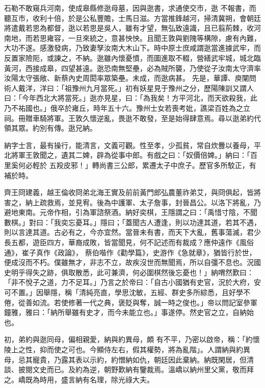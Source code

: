 \begin{pinyinscope}
 石勒不敢窺兵河南，使成皋縣修逖母墓，因與逖書，求通使交市，逖
 不報書，而聽互市，收利十倍，於是公私豐贍，士馬日滋。方當推鋒越河，掃清冀朔，會朝廷將遣戴若思為都督，逖以若思是吳人，雖有才望，無弘致遠識，且已翦荊棘，收河南地，而若思雍容，一旦來統之，意甚怏怏。且聞王敦與劉隗等構隙，慮有內難，大功不遂。感激發病，乃致妻孥汝南大木山下。時中原士庶咸謂逖當進據武牢，而反置家險阨，或諫之，不納。逖雖內懷憂憤，而圖進取不輟，營繕武牢城，城北臨黃河，西接成皋，四望甚遠。逖恐南無堅壘，必為賊所襲，乃使從子汝南太守濟率汝陽太守張敞、新蔡內史周閎率眾築壘。未成，而逖病甚。
 先是，華譚、庾闡問術人戴洋，洋曰：「祖豫州九月當死。」初有妖星見于豫州之分，歷陽陳訓又謂人曰：「今年西北大將當死。」逖亦見星，曰：「為我矣！方平河北，而天欲殺我，此乃不祐國也。」俄卒於雍丘，時年五十六。豫州士女若喪考妣，譙梁百姓為之立祠。冊贈車騎將軍。王敦久懷逆亂，畏逖不敢發，至是始得肆意焉。尋以逖弟約代領其眾。約別有傳。逖兄納。



 納字士言，最有操行，能清言，文義可觀。性至孝，少孤貧，常自炊釁以養母，平北將軍王敦聞之，遺其二婢，辟為從事中郎。有戲之曰：「奴價倍婢。」納曰：「百里奚何必輕於
 五羖皮邪！」轉尚書三公郎，累遷太子中庶子。歷官多所駮正，有補於時。



 齊王冏建義，越王倫收冏弟北海王實及前前黃門郎弘農董祚弟艾，與冏俱起，皆將害之，納上疏救焉，並見宥。後為中護軍、太子詹事，封晉昌公。以洛下將亂，乃避地東南。元帝作相，引為軍諮祭酒。納好奕棋，王隱謂之曰：「禹惜寸陰，不聞數棋。」對曰：「我奕忘憂耳。」隱曰；「蓋聞古人遭逢，則以功達其道，若其不遇，則以言達其道。古必有之，今亦宜然。當晉未有書，而天下大亂，舊事蕩滅，君少長五都，遊臣四方，華裔成敗，皆當聞見，何不記述而有裁成？應仲遠作《風俗通》，崔子真作《政論》，
 蔡伯喈作《勸學篇》，史游作《急就章》，猶皆行於世，便成沒而不朽。僕雖無才，非志不立，故疾沒世而無聞焉，所以自彊不息也。況國史明乎得失之跡，俱取散悉，此可兼濟，何必圍棋然後忘憂也！」納喟然歎曰：「非不悅子之道，力不足耳。」乃言之於帝曰：「自古小國猶有史官，況於大府，安可不置。」因舉隱，稱「清純亮直，學思沈敏，五經、群史多所綜悉，且好學不倦，從善如流。若使修著一代之典，褒貶與奪，誠一時之俊也。」帝以問記室參軍鐘雅，雅曰：「納所舉雖有史才，而今未能立也。」事遂停。然史官之立，自納始也。



 初，弟約與逖同母，偏相親愛，納與約異母，頗
 有不平，乃密以啟帝，稱：「約懷陵上之性，抑而使之可也。今顯侍左右，假其權勢，將為亂階」。人謂納與約異母，忌其寵貴，乃露其表以示約，約憎納如仇，朝廷因此棄納。納既閑居，但清談、披閱文史而已。及約為逆，朝野歎納有鑒裁焉。溫嶠以納州里父黨，敬而拜之。嶠既為時用，盛言納有名理，除光祿大夫。




\end{pinyinscope}
